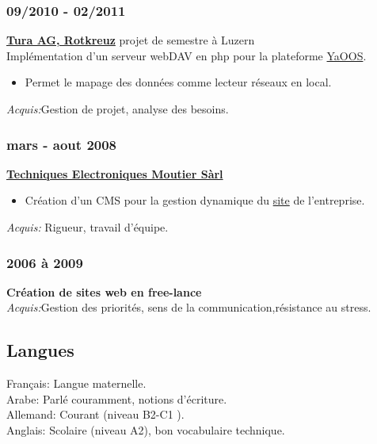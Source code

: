 \documentclass[12pt,a4paper,twoside]{report}
\begin{document}
 \subsubsection{09/2010 - 02/2011}
 \vspace{-0.4cm}
\textbf{\href{http://www.tura.ch/}{Tura AG, Rotkreuz} }projet de semestre à Luzern\\
Implémentation d'un serveur webDAV en php pour la plateforme  \href{http://www.yaoos.org/}{YaOOS}. 
\begin{itemize}
\item Permet le mapage des données comme lecteur réseaux en local.
\end{itemize}
\textit{Acquis:}Gestion de projet, analyse des besoins.
\vspace{-0.2cm}
 \subsubsection{mars - aout 2008}
 \vspace{-0.4cm}
\textbf{\href{http://www.tem-sarl.ch/fr}{Techniques Electroniques Moutier Sàrl}}
\begin{itemize}
\item Création d'un CMS pour la gestion dynamique du  \href{http://www.tem-sarl.ch/fr}{site} de l'entreprise.
\end{itemize}
\textit{Acquis:} Rigueur, travail d'équipe.
\vspace{-0.2cm}
 \subsubsection{2006 à 2009}
 \vspace{-0.4cm}
\textbf{Création de sites web en free-lance}\\
\textit{Acquis:}Gestion des priorités, sens de la communication,résistance au stress.

\subsection{Langues }
\vspace{-0.4cm}
Français: Langue maternelle.\\
Arabe: Parlé couramment, notions d'écriture. \\
Allemand: Courant (niveau B2-C1 ).\\
Anglais: Scolaire (niveau A2), bon vocabulaire technique.

\cleardoublepage

\end{document}
